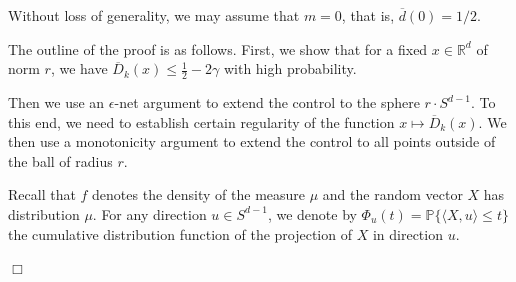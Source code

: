 \documentclass[12pt]{article}
\newcommand{\R}{\mathbb{R}}
\newcommand{\ol}{\overline}
\newcommand{\field}[1]{\mathbb{#1}}
\newcommand{\PROB}{\field{P}}
\newcommand{\qed}{\hfill $\Box$}
\newenvironment{proof}{\par\noindent{\bf Proof:}}{\qed \par\medskip\noindent}
\begin{document}
\begin{proof}
Without loss of generality, we may assume that $m=0$, that is, $\ol{d}(0)=1/2$.

The outline of the proof is as follows. First, we show that for a
fixed $x\in \R^d$ of norm $r$,
we have $\ol{D}_k(x)\leq \frac{1}{2}-2\gamma$ with high
probability.

Then we use an $\epsilon$-net argument to extend the control to the
sphere $r\cdot S^{d-1}$. To this end, we need to establish certain
regularity of the function $x\mapsto \ol{D}_k(x)$. 
We then use a monotonicity argument to extend the control to all points outside of the ball of radius $r$.


Recall that $f$ denotes the density of the measure $\mu$ and the random
vector $X$ has distribution $\mu$.
For any direction $u\in S^{d-1}$, we denote by
$\Phi_u(t)=\PROB\{\langle X,u\rangle \le t\}$ the cumulative
distribution function of the projection of $X$ in direction $u$.


\end{proof}
\end{document}
